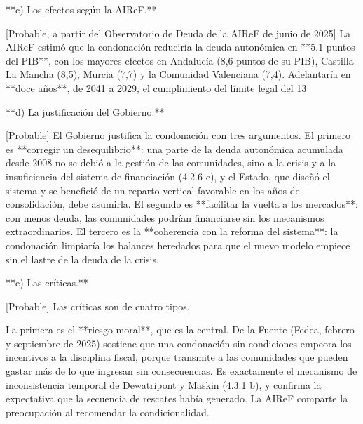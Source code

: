 \documentclass[10pt,a4paper]{article}
\begin{document}
**c) Los efectos según la AIReF.**

[Probable, a partir del Observatorio de Deuda de la AIReF de junio de 2025] La AIReF estimó que la condonación reduciría la deuda autonómica en **5,1 puntos del PIB**, con los mayores efectos en Andalucía (8,6 puntos de su PIB), Castilla-La Mancha (8,5), Murcia (7,7) y la Comunidad Valenciana (7,4). Adelantaría en **doce años**, de 2041 a 2029, el cumplimiento del límite legal del 13%

**d) La justificación del Gobierno.**

[Probable] El Gobierno justifica la condonación con tres argumentos. El primero es **corregir un desequilibrio**: una parte de la deuda autonómica acumulada desde 2008 no se debió a la gestión de las comunidades, sino a la crisis y a la insuficiencia del sistema de financiación (4.2.6 c), y el Estado, que diseñó el sistema y se benefició de un reparto vertical favorable en los años de consolidación, debe asumirla. El segundo es **facilitar la vuelta a los mercados**: con menos deuda, las comunidades podrían financiarse sin los mecanismos extraordinarios. El tercero es la **coherencia con la reforma del sistema**: la condonación limpiaría los balances heredados para que el nuevo modelo empiece sin el lastre de la deuda de la crisis.

**e) Las críticas.**

[Probable] Las críticas son de cuatro tipos.

La primera es el **riesgo moral**, que es la central. De la Fuente (Fedea, febrero y septiembre de 2025) sostiene que una condonación sin condiciones empeora los incentivos a la disciplina fiscal, porque transmite a las comunidades que pueden gastar más de lo que ingresan sin consecuencias. Es exactamente el mecanismo de inconsistencia temporal de Dewatripont y Maskin (4.3.1 b), y confirma la expectativa que la secuencia de rescates había generado. La AIReF comparte la preocupación al recomendar la condicionalidad.
\end{document}
